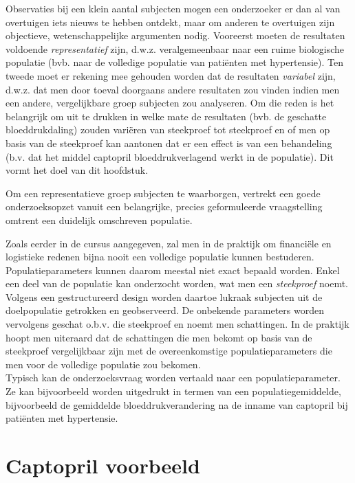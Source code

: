 \documentclass[
  12pt,dutch,coursenotes]{book}
\begin{document}
Observaties bij een klein aantal subjecten mogen een onderzoeker er dan al van overtuigen iets nieuws te hebben ontdekt, maar om anderen te overtuigen zijn objectieve, wetenschappelijke argumenten nodig.
Vooreerst moeten de
resultaten voldoende \emph{representatief} zijn, d.w.z. veralgemeenbaar
naar een ruime biologische populatie (bvb. naar de volledige populatie van patiënten met hypertensie).
Ten tweede moet er rekening mee gehouden worden dat de resultaten \emph{variabel} zijn, d.w.z. dat men
door toeval doorgaans andere resultaten zou vinden indien men een andere, vergelijkbare
groep subjecten zou analyseren.
Om die reden is het belangrijk om uit te drukken in welke mate de resultaten
(bvb. de geschatte bloeddrukdaling) zouden variëren van steekproef tot steekproef en of men op basis van de steekproef kan aantonen dat er een effect is van een behandeling (b.v. dat het middel captopril bloeddrukverlagend werkt in de populatie).
Dit vormt het doel van dit hoofdstuk.

Om een representatieve groep subjecten te waarborgen, vertrekt een goede
onderzoeksopzet vanuit een belangrijke, precies geformuleerde vraagstelling
omtrent een duidelijk omschreven populatie.

Zoals eerder in de cursus aangegeven, zal men in de praktijk om financiële en logistieke redenen bijna nooit een
volledige populatie kunnen bestuderen.
Populatieparameters kunnen daarom meestal
niet exact bepaald worden. Enkel een deel van de populatie kan onderzocht
worden, wat men een \emph{steekproef} noemt. Volgens een
gestructureerd design worden daartoe lukraak subjecten uit de doelpopulatie
getrokken en geobserveerd. De onbekende parameters worden vervolgens geschat
o.b.v. die steekproef en noemt men schattingen. In de praktijk hoopt men uiteraard dat de schattingen die men bekomt op basis van de steekproef vergelijkbaar zijn met de overeenkomstige populatieparameters die men voor de volledige populatie zou bekomen.\\
Typisch kan de onderzoeksvraag worden vertaald naar een populatieparameter.
Ze kan bijvoorbeeld worden uitgedrukt in termen van een populatiegemiddelde, bijvoorbeeld de gemiddelde bloeddrukverandering na de inname van captopril bij patiënten met hypertensie.

\hypertarget{captopril-voorbeeld}{%
\section{Captopril voorbeeld}\label{captopril-voorbeeld}}
\end{document}
